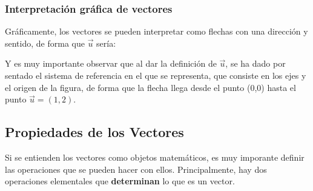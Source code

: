 \documentclass[ %
    oneside,    %
    10pt        %
]{apuntes} %
\begin{document}
\subsubsection{Interpretación gráfica de vectores}
Gráficamente, los vectores se pueden interpretar como flechas con una dirección y sentido, de forma que $\vec{u}$ sería:
\begin{figure}[ht]
	\centering
\end{figure}

Y es muy importante observar que al dar la definición de $\vec{u}$, se ha dado por sentado el sistema de referencia en el que se representa, que consiste en los ejes y el origen de la figura, de forma que la flecha llega desde el punto (0,0) hasta el punto $\vec{u} = (1,2)$.

\subsection{Propiedades de los Vectores}
Si se entienden los vectores como objetos matemáticos, es muy imporante definir las operaciones que se pueden hacer con ellos. Principalmente, hay dos operaciones elementales que \textbf{determinan} lo que es un vector.
\end{document}
